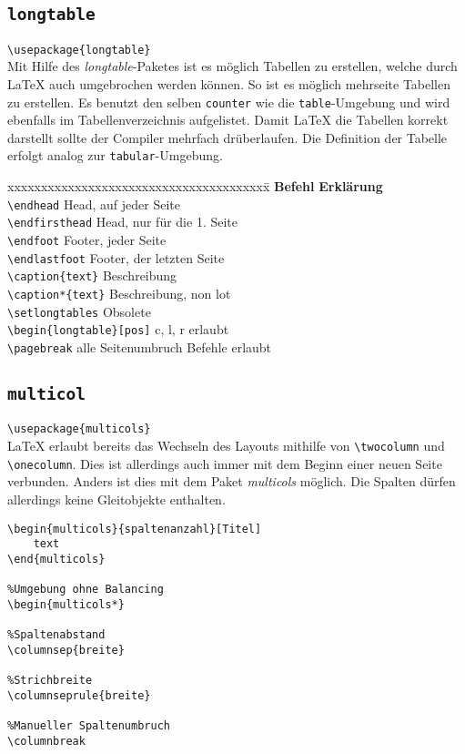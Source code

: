 \subsection{\texttt{longtable}}
\verb=\usepackage{longtable}=\\
Mit Hilfe des \textsl{longtable}-Paketes ist es möglich Tabellen zu erstellen, welche durch \LaTeX{} auch umgebrochen werden können. So ist es möglich mehrseite Tabellen zu erstellen. Es benutzt den selben \verb=counter= wie die \verb=table=-Umgebung und wird ebenfalls im Tabellenverzeichnis aufgelistet. Damit \LaTeX{} die Tabellen korrekt darstellt sollte der Compiler mehrfach drüberlaufen. Die Definition der Tabelle erfolgt analog zur \verb=tabular=-Umgebung.
\begin{tabbing}
xxxxxxxxxxxxxxxxxxxxxxxxxxxxxxxxxxxxxxx\=\kill
\textbf{Befehl}				\>\textbf{Erklärung}\\
\verb=\endhead=			\>Head, auf jeder Seite\\
\verb=\endfirsthead=			\>Head, nur für die 1. Seite\\
\verb=\endfoot=				\>Footer, jeder Seite\\
\verb=\endlastfoot=			\>Footer, der letzten Seite\\
\verb=\caption{text}=			\>Beschreibung\\
\verb=\caption*{text}=		\>Beschreibung, non lot\\
\verb=\setlongtables=			\>Obsolete\\
\verb=\begin{longtable}[pos]=	\>c, l, r erlaubt\\
\verb=\pagebreak=			\>alle Seitenumbruch Befehle erlaubt
\end{tabbing}
\subsection{\texttt{multicol}}
\verb=\usepackage{multicols}=\\
\LaTeX{} erlaubt bereits das Wechseln des Layouts mithilfe von \verb=\twocolumn= und \verb=\onecolumn=. Dies ist allerdings auch immer mit dem Beginn einer neuen Seite verbunden. Anders ist dies mit dem Paket \textsl{multicols} möglich. Die Spalten dürfen allerdings keine Gleitobjekte enthalten.
\begin{lstlisting}[caption={Mulicol-Umgebung}]
%Umgebung
\begin{multicols}{spaltenanzahl}[Titel]
	text
\end{multicols}

%Umgebung ohne Balancing
\begin{multicols*}

%Spaltenabstand
\columnsep{breite}

%Strichbreite
\columnseprule{breite}

%Manueller Spaltenumbruch
\columnbreak
\end{lstlisting}